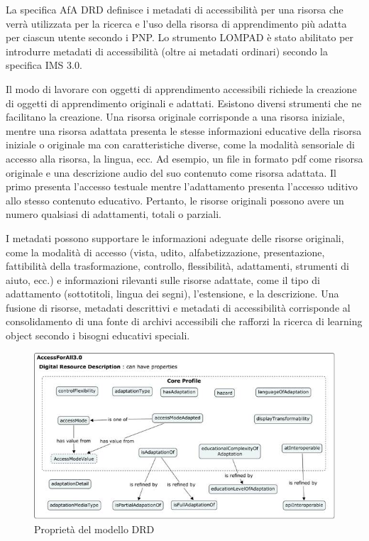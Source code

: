 La specifica AfA DRD definisce i metadati di accessibilità per una risorsa che verrà utilizzata per la ricerca e l'uso della risorsa di apprendimento più adatta per ciascun utente secondo i PNP. Lo strumento LOMPAD è stato abilitato per introdurre metadati di accessibilità (oltre ai metadati ordinari) secondo la specifica IMS 3.0.

Il modo di lavorare con oggetti di apprendimento accessibili richiede la creazione di oggetti di apprendimento originali e adattati. Esistono diversi strumenti che ne facilitano la creazione. Una risorsa originale corrisponde a una risorsa iniziale, mentre una risorsa adattata presenta le stesse informazioni educative della risorsa iniziale o originale ma con caratteristiche diverse, come la modalità sensoriale di accesso alla risorsa, la lingua, ecc. Ad esempio, un file in formato pdf come risorsa originale e una descrizione audio del suo contenuto come risorsa adattata. Il primo presenta l'accesso testuale mentre l'adattamento presenta l'accesso uditivo allo stesso contenuto educativo. Pertanto, le risorse originali possono avere un numero qualsiasi di adattamenti, totali o parziali.

I metadati possono supportare le informazioni adeguate delle risorse originali, come la modalità di accesso (vista, udito, alfabetizzazione, presentazione, fattibilità della trasformazione, controllo, flessibilità, adattamenti, strumenti di aiuto, ecc.) e informazioni rilevanti sulle risorse adattate, come il tipo di adattamento (sottotitoli, lingua dei segni), l'estensione, e la descrizione. Una fusione di risorse, metadati descrittivi e metadati di accessibilità corrisponde al consolidamento di una fonte di archivi accessibili che rafforzi la ricerca di learning object secondo i bisogni educativi speciali.

\begin{figure}[H]
\centering
\includegraphics[scale=0.7]{res/drd.png}
\caption{Proprietà del modello DRD}
\label{fig:drd}
\end{figure}

